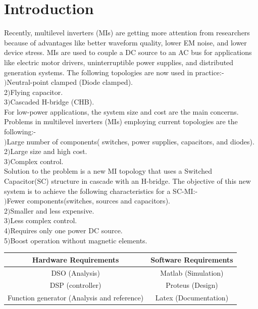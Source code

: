 \documentclass[12pt,a4paper]{report}
\begin{document}
\clearpage
\section*{Introduction}
\hspace{0.2cm} Recently, multilevel inverters (MIs) are getting more attention from researchers because of advantages like better waveform quality, lower EM noise, and lower device stress. MIs are used to couple a DC source to an AC bus for applications like electric motor drivers, uninterruptible power supplies, and distributed generation systems. The following topologies are now used in practice:-\\

$)$Neutral-point clamped (Diode clamped).\\
2$)$Flying capacitor.\\
3$)$Cascaded H-bridge (CHB).\\

\noindent For low-power applications, the system size and cost are the main concerns.
Problems in multilevel inverters (MIs) employing current topologies are the following:-\\

$)$Large number of components( switches, power supplies, capacitors, and diodes).\\
2$)$Large size and high cost.\\
3$)$Complex control.\\

\noindent Solution to the problem is a new MI topology that uses a Switched Capacitor(SC) structure in cascade with an H-bridge. The objective of this new system is to achieve the following characteristics for a  SC-MI:-\\

$)$Fewer components(switches, sources and capacitors).\\
2$)$Smaller and less expensive.\\
3$)$Less complex control.\\
4$)$Requires only one power DC source.\\
5$)$Boost operation without magnetic elements.\\
	
\begin{center}
	\begin{tabular}{|c|c|} 
		\hline
		{\bf Hardware Requirements} & {\bf Software Requirements} \\  
		\hline
		DSO (Analysis) & Matlab (Simulation) \\ 
		\hline
		DSP (controller) & Proteus (Design) \\
		\hline
		Function generator (Analysis and reference) & Latex (Documentation) \\
		\hline
	\end{tabular}
\end{center}
	
\end{document}
